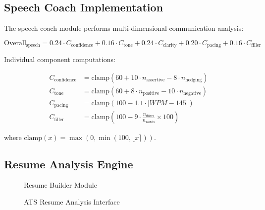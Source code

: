 \documentclass[12pt,a4paper,oneside]{report}
\begin{document}
\subsection{Speech Coach Implementation}

The speech coach module performs multi-dimensional communication analysis:

\begin{equation}
\text{Overall}_{\text{speech}} = 0.24 \cdot C_{\text{confidence}} + 0.16 \cdot C_{\text{tone}} + 0.24 \cdot C_{\text{clarity}} + 0.20 \cdot C_{\text{pacing}} + 0.16 \cdot C_{\text{filler}}
\label{eq:speech_overall}
\end{equation}

Individual component computations:

\begin{align}
C_{\text{confidence}} &= \text{clamp}(60 + 10 \cdot n_{\text{assertive}} - 8 \cdot n_{\text{hedging}}) \label{eq:confidence} \\
C_{\text{tone}} &= \text{clamp}(60 + 8 \cdot n_{\text{positive}} - 10 \cdot n_{\text{negative}}) \label{eq:tone} \\
C_{\text{pacing}} &= \text{clamp}(100 - 1.1 \cdot |WPM - 145|) \label{eq:pacing} \\
C_{\text{filler}} &= \text{clamp}\left(100 - 9 \cdot \frac{n_{\text{fillers}}}{n_{\text{words}}} \times 100\right) \label{eq:filler_control}
\end{align}

\noindent where $\text{clamp}(x) = \max(0, \min(100, \lfloor x \rceil))$.


\subsection{Resume Analysis Engine}

\begin{figure}[H]
\centering
{}
\caption{Resume Builder Module}
\label{fig:resume_builder}
\end{figure}

\begin{figure}[H]
\centering
{}
\caption{ATS Resume Analysis Interface}
\label{fig:resume_analysis}
\end{figure}
\end{document}
